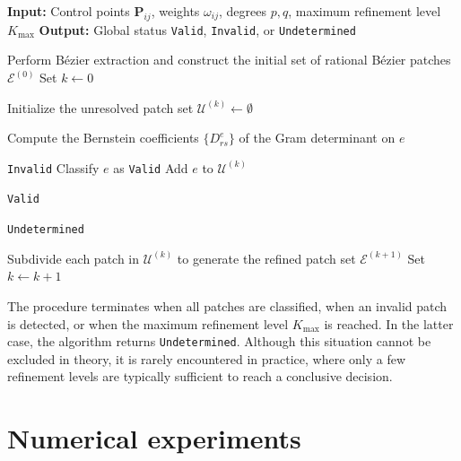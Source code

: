 \documentclass{jssc}
\begin{document}
\begin{algorithm}
\caption{Hierarchical bijectivity checking for rational T-spline parametrizations}
\label{alg:bijectivity_check}
\begin{algorithmic}[1]
\STATE \textbf{Input:} Control points $\mathbf{P}_{ij}$, weights $\omega_{ij}$, degrees $p,q$, maximum refinement level $K_{\max}$
\STATE \textbf{Output:} Global status \texttt{Valid}, \texttt{Invalid}, or \texttt{Undetermined}

\STATE Perform B\'ezier extraction and construct the initial set of rational B\'ezier patches $\mathcal{E}^{(0)}$
\STATE Set $k \gets 0$

    \STATE Initialize the unresolved patch set $\mathcal{U}^{(k)} \gets \emptyset$
    
        \STATE Compute the Bernstein coefficients $\{D_{rs}^e\}$ of the Gram determinant on $e$
        
            \RETURN \texttt{Invalid}
            \STATE Classify $e$ as \texttt{Valid}
        \ELSE
            \STATE Add $e$ to $\mathcal{U}^{(k)}$
        \ENDIF
    \ENDFOR
    
        \RETURN \texttt{Valid}
    \ENDIF
    
        \RETURN \texttt{Undetermined}
    \ENDIF
    
    \STATE Subdivide each patch in $\mathcal{U}^{(k)}$ to generate the refined patch set $\mathcal{E}^{(k+1)}$
    \STATE Set $k \gets k+1$
\ENDWHILE
\end{algorithmic}
\end{algorithm}

The procedure terminates when all patches are classified, when an invalid patch is detected, or when the maximum refinement level $K_{\max}$ is reached. In the latter case, the algorithm returns \texttt{Undetermined}. Although this situation cannot be excluded in theory, it is rarely encountered in practice, where only a few refinement levels are typically sufficient to reach a conclusive decision.

\section{Numerical experiments}
\label{sec:numerical}
\end{document}
